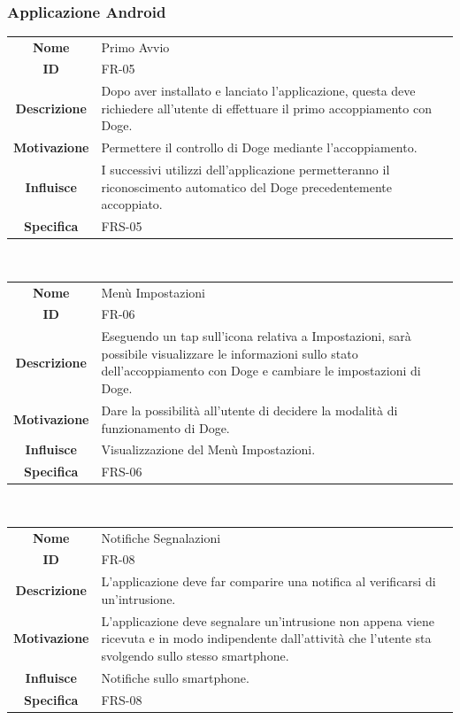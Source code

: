 \documentclass{article}
\begin{document}
~

\subsubsection{Applicazione Android}

\begin{adjustbox}{center}
\begin{tabular}{|c|p{10cm}|}
\hline
\textbf{Nome} & Primo Avvio \\
\textbf{ID} & FR-05 \\
\textbf{Descrizione} & Dopo aver installato e lanciato l'applicazione, questa deve richiedere all'utente di effettuare il primo accoppiamento con Doge. \\
\textbf{Motivazione} & Permettere il controllo di Doge mediante l'accoppiamento. \\
\textbf{Influisce} & I successivi utilizzi dell'applicazione permetteranno il riconoscimento automatico del Doge precedentemente accoppiato. \\
\textbf{Specifica} & FRS-05 \\
\hline
\end{tabular}
\end{adjustbox}

~

\begin{adjustbox}{center}
\begin{tabular}{|c|p{10cm}|}
\hline
\textbf{Nome} & Menù Impostazioni \\
\textbf{ID} & FR-06 \\
\textbf{Descrizione} & Eseguendo un tap sull'icona relativa a Impostazioni, sarà possibile visualizzare le informazioni sullo stato dell'accoppiamento con Doge e cambiare le impostazioni di Doge. \\
\textbf{Motivazione} & Dare la possibilità all'utente di decidere la modalità di funzionamento di Doge. \\
\textbf{Influisce} & Visualizzazione del Menù Impostazioni. \\
\textbf{Specifica} & FRS-06 \\
\hline
\end{tabular}
\end{adjustbox}

~

\begin{adjustbox}{center}
\begin{tabular}{|c|p{10cm}|}
\hline
\textbf{Nome} & Notifiche Segnalazioni \\
\textbf{ID} & FR-08 \\
\textbf{Descrizione} & L'applicazione deve far comparire una notifica al verificarsi di un'intrusione. \\
\textbf{Motivazione} & L'applicazione deve segnalare un'intrusione non appena viene ricevuta e in modo indipendente dall'attività che l'utente sta svolgendo sullo stesso smartphone. \\
\textbf{Influisce} & Notifiche sullo smartphone. \\
\textbf{Specifica} & FRS-08 \\
\hline
\end{tabular}
\end{adjustbox}
\end{document}
